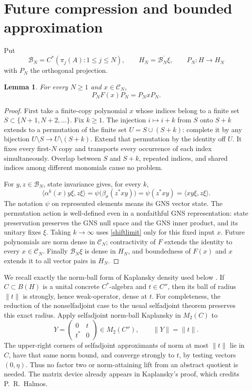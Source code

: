 \documentclass[11pt]{article}
\newtheorem{lemma}[theorem]{Lemma}
\newcommand{\B}{\mathcal B}
\newcommand{\C}{\mathcal C}
\newcommand{\norm}[1]{\lVert#1\rVert}
\begin{document}
\section{Future compression and bounded approximation}
Put
\[
 \B_N=C^*(\pi_j(A):1\leq j\leq N),\qquad
 H_N=\overline{\B_N\xi},\qquad
 P_N:H\to H_N
\]
with \(P_N\) the orthogonal projection.
\begin{lemma}\label{compression}
For every \(N\geq1\) and \(x\in\C_N\),
\[
 P_NF(x)P_N=P_NxP_N .
\]
\end{lemma}
\begin{proof}
First take a finite-copy polynomial \(x\) whose indices belong to a finite
set \(S\subset\{N+1,N+2,\ldots\}\). Fix \(k\geq1\).
The injection \(i\mapsto i+k\) from \(S\) onto \(S+k\) extends to a
permutation of the finite set \(U=S\cup(S+k)\): complete it by any
bijection \(U\setminus S\to U\setminus(S+k)\). Extend that permutation
by the identity off \(U\). It fixes every first-\(N\) copy and transports
every occurrence of each index simultaneously. Overlap between \(S\)
and \(S+k\), repeated indices, and shared indices among different
monomials cause no problem.

For \(y,z\in\B_N\), state invariance gives, for every \(k\),
\[
 \langle\alpha^k(x)y\xi,z\xi\rangle
 =\psi\bigl(\beta_\sigma(z^*xy)\bigr)
 =\psi(z^*xy)=\langle xy\xi,z\xi\rangle.
\]
The notation \(\psi\) on represented elements means its GNS vector state.
The permutation action is well-defined even in a nonfaithful GNS
representation: state preservation preserves the GNS null space and
the GNS inner product, and its unitary fixes \(\xi\).
Taking \(k\to\infty\) uses \eqref{shiftlimit} only for this fixed input
\(x\). Future polynomials are norm dense in \(\C_N\); contractivity
of \(F\) extends the identity to every \(x\in\C_N\).
Finally \(\B_N\xi\) is dense in \(H_N\), and boundedness of \(F(x)\)
and \(x\) extends it to all vector pairs in \(H_N\).
\end{proof}

We recall exactly the norm-ball form of Kaplansky density used below
\cite{Kaplansky}. If \(C\subset B(H)\) is a unital concrete \(C^*\)-algebra
and \(t\in C''\), then its ball of radius \(\norm t\) is strongly, hence
weak-operator, dense at \(t\). For completeness, the reduction of the
nonselfadjoint case to the usual selfadjoint theorem preserves this
exact radius. Apply selfadjoint norm-ball Kaplansky in \(M_2(C)\) to
\[
 Y=\begin{pmatrix}0&t\\t^*&0\end{pmatrix}
       \in M_2(C''),\qquad \norm Y=\norm t .
\]
The upper-right corners of selfadjoint approximants of norm at most
\(\norm t\) lie in \(C\), have that same norm bound, and converge strongly
to \(t\), by testing vectors \((0,\eta)\). Thus no factor two or
norm-attaining lift from an abstract quotient is needed. The matrix device
already appears in Kaplansky's proof, which credits P.~R.~Halmos.
\end{document}
